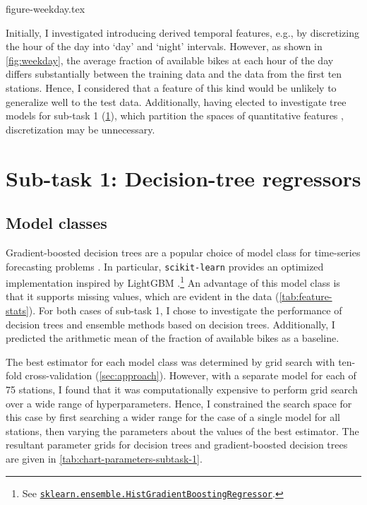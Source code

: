 \documentclass[11pt]{extarticle}
\newcommand{\sklearn}[2]{\href{https://scikit-learn.org/stable/modules/generated/sklearn.#1.#2.html}{\lstinline|sklearn.#1.#2|}}
\begin{document}
{figure-weekday.tex}

Initially, I investigated introducing derived temporal features, e.g., by discretizing
the hour of the day into `day' and `night' intervals.
However, as shown in \cref{fig:weekday}, the average fraction of available bikes at
each hour of the day differs substantially between the training data and the data from
the first ten stations.
Hence, I considered that a feature of this kind would be unlikely to generalize well to
the test data.
Additionally, having elected to investigate tree models for sub-task 1
(\cref{sec:results-subtask-1}), which partition the spaces of quantitative features
\parencite[155]{Flach2012}, discretization may be unnecessary.

\section{Sub-task 1: Decision-tree regressors}
\label{sec:results-subtask-1}

\subsection{Model classes}

Gradient-boosted decision trees are a popular choice of model class for time-series
forecasting problems \parencite{Bojer2021}.
In particular, \texttt{scikit-learn} provides an optimized implementation inspired by
LightGBM \parencite{Ke2017}.\footnote{See
  \sklearn{ensemble}{HistGradientBoostingRegressor}.
}
An advantage of this model class is that it supports missing values, which are evident
in the data (\cref{tab:feature-stats}).
For both cases of sub-task 1, I chose to investigate the performance of decision trees
and ensemble methods based on decision trees.
Additionally, I predicted the arithmetic mean of the fraction of available bikes as a
baseline.

The best estimator for each model class was determined by grid search with ten-fold
cross-validation (\cref{sec:approach}).
However, with a separate model for each of 75 stations, I found that it was
computationally expensive to perform grid search over a wide range of hyperparameters.
Hence, I constrained the search space for this case by first searching a wider range
for the case of a single model for all stations, then varying the parameters about the
values of the best estimator.
The resultant parameter grids for decision trees and gradient-boosted decision trees
are given in \cref{tab:chart-parameters-subtask-1}.
\end{document}
